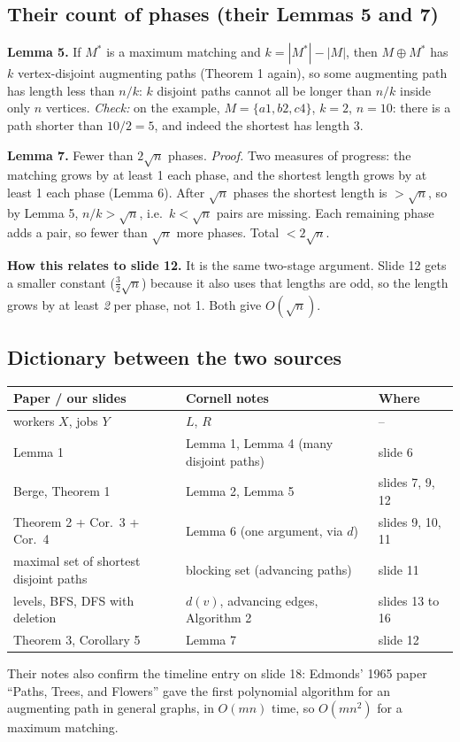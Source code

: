 \documentclass[11pt,a4paper]{article}
\begin{document}
\subsection*{Their count of phases (their Lemmas 5 and 7)}
\textbf{Lemma 5.} If $M^*$ is a maximum matching and $k=|M^*|-|M|$, then $M\oplus M^*$ has $k$ vertex-disjoint augmenting paths (Theorem 1 again), so some augmenting path has length less than $n/k$: $k$ disjoint paths cannot all be longer than $n/k$ inside only $n$ vertices. \emph{Check:} on the example, $M=\{a1,b2,c4\}$, $k=2$, $n=10$: there is a path shorter than $10/2=5$, and indeed the shortest has length 3.

\textbf{Lemma 7.} Fewer than $2\sqrt n$ phases. \emph{Proof.} Two measures of progress: the matching grows by at least 1 each phase, and the shortest length grows by at least 1 each phase (Lemma 6). After $\sqrt n$ phases the shortest length is $>\sqrt n$, so by Lemma 5, $n/k>\sqrt n$, i.e.\ $k<\sqrt n$ pairs are missing. Each remaining phase adds a pair, so fewer than $\sqrt n$ more phases. Total $<2\sqrt n$.

\textbf{How this relates to slide 12.} It is the same two-stage argument. Slide 12 gets a smaller constant ($\frac32\sqrt n$) because it also uses that lengths are odd, so the length grows by at least \emph{2} per phase, not 1. Both give $O(\sqrt n)$.

\subsection*{Dictionary between the two sources}
\begin{center}
\begin{tabular}{@{}p{4.1cm}p{4.7cm}p{5.2cm}@{}}
\toprule
\textbf{Paper / our slides} & \textbf{Cornell notes} & \textbf{Where}\\\midrule
workers $X$, jobs $Y$ & $L$, $R$ & --\\
Lemma 1 & Lemma 1, Lemma 4 (many disjoint paths) & slide 6\\
Berge, Theorem 1 & Lemma 2, Lemma 5 & slides 7, 9, 12\\
Theorem 2 + Cor.\ 3 + Cor.\ 4 & Lemma 6 (one argument, via $d$) & slides 9, 10, 11\\
maximal set of shortest disjoint paths & blocking set (advancing paths) & slide 11\\
levels, BFS, DFS with deletion & $d(v)$, advancing edges, Algorithm 2 & slides 13 to 16\\
Theorem 3, Corollary 5 & Lemma 7 & slide 12\\\bottomrule
\end{tabular}
\end{center}
Their notes also confirm the timeline entry on slide 18: Edmonds' 1965 paper ``Paths, Trees, and Flowers'' gave the first polynomial algorithm for an augmenting path in general graphs, in $O(mn)$ time, so $O(mn^2)$ for a maximum matching.
\end{document}
